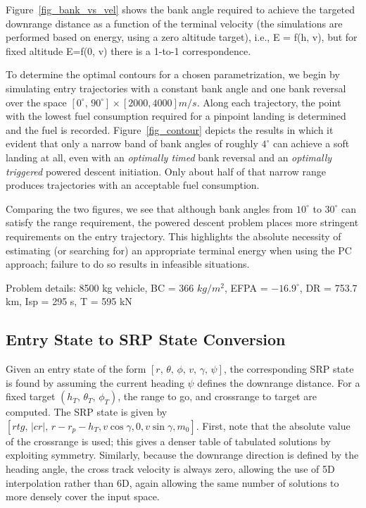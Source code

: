 \documentclass[]{article}
\begin{document}
Figure~\ref{fig_bank_vs_vel} shows the bank angle required to achieve the targeted downrange distance as a function of the terminal velocity (the simulations are performed based on energy, using a zero altitude target), i.e., E = f(h, v), but for fixed altitude E=f(0, v) there is a 1-to-1 correspondence.
 
To determine the optimal contours for a chosen parametrization, we begin by simulating entry trajectories with a constant bank angle and one bank reversal over the space $[0^\circ,\,90^\circ]\times [2000, 4000] m/s$. Along each trajectory, the point with the lowest fuel consumption required for a pinpoint landing is determined and the fuel is recorded. Figure~\ref{fig_contour} depicts the results in which it evident that only a narrow band of bank angles of roughly $4^\circ$ can achieve a soft landing at all, even with an \textit{optimally timed} bank reversal and an \textit{optimally triggered} powered descent initiation. Only about half of that narrow range produces trajectories with an acceptable fuel consumption.

Comparing the two figures, we see that although bank angles from $10^\circ$ to $30^\circ$ can satisfy the range requirement, the powered descent problem places more stringent requirements on the entry trajectory. This highlights the absolute necessity of estimating (or searching for) an appropriate terminal energy when using the PC approach; failure to do so results in infeasible situations.

Problem details: 8500 kg vehicle, BC = 366 $kg/m^2$, EFPA = $-16.9^\circ$, DR = 753.7 km, Isp = 295 s, T = 595 kN

\subsection{Entry State to SRP State Conversion}
Given an entry state of the form $[r,\, \theta,\, \phi,\, v,\, \gamma,\, \psi]$, the corresponding SRP state is found by assuming the current heading $\psi$ defines the downrange distance. For a fixed target $(h_T,\, \theta_T,\, \phi_T)$, the range to go, and crossrange to target are computed. The SRP state is given by $[rtg,\, |cr|,\, r-r_p-h_T, v\cos\gamma, 0, v\sin\gamma, m_0]$. First, note that the absolute value of the crossrange is used; this gives a denser table of tabulated solutions by exploiting symmetry. Similarly, because the downrange direction is defined by the heading angle, the cross track velocity is always zero, allowing the use of 5D interpolation rather than 6D, again allowing the same number of solutions to more densely cover the input space. 
\end{document}
